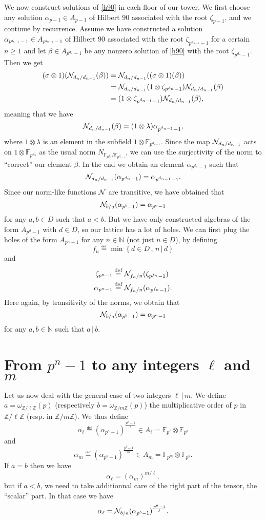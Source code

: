 \documentclass[a4paper,11pt]{article}
\begin{document}
We now construct solutions of \eqref{h90} in each floor of our
tower. We first choose any solution $\alpha_{p-1}\in A_{p-1}$ of Hilbert $90$
associated with the root $\zeta_{p-1}$, and we continue by recurrence. Assume we
have constructed a solution $\alpha_{p^{d_{n-1}}-1}\in A_{p^{d_{n-1}}-1}$ of
Hilbert $90$ associated with the root $\zeta_{p^{d_{n-1}}-1}$ for a certain
$n\geq1$ and let
$\beta\in A_{p^{d_n}-1}$ be any nonzero solution of \eqref{h90} with the root
$\zeta_{p^{d_n}-1}$.
Then we get
\begin{align*}
  (\sigma\otimes1)(\mathcal N_{d_n/d_{n-1}}(\beta)) &= \mathcal N_{d_n/d_{n-1}}((\sigma\otimes1)(\beta)) \\
  &= \mathcal N_{d_n/d_{n-1}}(1\otimes\zeta_{p^{d_n}-1}) \mathcal N_{d_n/d_{n-1}}(\beta) \\
  &= (1\otimes\zeta_{p^{d_{n-1}}-1})\mathcal N_{d_n/d_{n-1}}(\beta),
\end{align*}
meaning that we have
\[
  \mathcal N_{d_n/d_{n-1}}(\beta)=(1\otimes\lambda)\alpha_{p^{d_{n-1}}-1},
\]
where $1\otimes\lambda$ is an element in the subfield $1\otimes\mathbb{F}_{p^{d_{n-1}}}$. Since the map
$\mathcal N_{d_n/d_{n-1}}$ acts on $1\otimes\mathbb{F}_{p^{d_n}}$ as the
usual norm $N_{\mathbb{F}_{p^{d_n}}/\mathbb{F}_{p^{d_{n-1}}}}$, we can use
the surjectivity of the norm to ``correct'' our element $\beta$. In the end we
obtain an element $\alpha_{p^{d_n}-1}$ such
that
\[
  \mathcal N_{d_n/d_{n-1}}(\alpha_{p^{d_n}-1})=
  \alpha_{p^{d_{n-1}}-1}.
\]
Since our norm-like functions $\mathcal N$ are transitive, we have obtained that 
\[
  \mathcal N_{b/a}(\alpha_{p^b-1})=\alpha_{p^a-1}
\]
for any $a,b\in D$ such that $a<b$. But we have only constructed algebras of the form
$A_{p^d-1}$ with $d\in D$, so our lattice has a lot of holes. We can first plug
the holes of the form $A_{p^{n}-1}$ for any $n\in\mathbb{N}$ (not just $n\in
D$), by defining 
\[
  f_n \eqdef \min\left\{ d\in D\,,\,n\,|\,d \right\}
\]
and
\begin{align*}
  \zeta_{p^n-1}&\overset{\text{def}}{=}  \mathcal N_{f_n/n}(\zeta_{p^{f_n}-1})\\
  \alpha_{p^n-1}&\overset{\text{def}}{=}
  \mathcal N_{f_n/n}(\alpha_{p^{f_n}-1}).
\end{align*}
Here again, by transitivity of the norms, we obtain that
\[
  \mathcal N_{b/a}(\alpha_{p^b-1})=\alpha_{p^a-1}
\]
for any $a,b\in\mathbb{N}$ such that $a\,|\,b$.


\section{From $p^n-1$ to any integers $\ell$ and $m$}
Let us now deal with the general case of two integers $\ell\,|\,m$. We define
$a=\omega_{\mathbb{Z}/\ell\mathbb{Z}}(p)$ (respectively
$b=\omega_{\mathbb{Z}/m\mathbb{Z}}(p)$) the multiplicative order of $p$ in
$\mathbb{Z}/\ell\mathbb{Z}$ (resp. in $\mathbb{Z}/m\mathbb{Z}$). We thus define
\[
  \alpha_\ell\eqdef(\alpha_{p^a-1})^{\frac{p^a-1}{\ell}}\in A_{\ell}=\mathbb{F}_{p^\ell}\otimes \mathbb{F}_{p^a}
\]
and
\[
  \alpha_m\eqdef(\alpha_{p^b-1})^{\frac{p^{b}-1}{m}}\in A_m=\mathbb{F}_{p^m}\otimes \mathbb{F}_{p^b}.
\]
If $a=b$ then we have 
\[
  \alpha_{\ell}=(\alpha_m)^{m/\ell},
\]
but if $a<b$, we need to take additionnal care of the right part of the tensor,
the ``scalar'' part. In that case we have
\[
  \alpha_\ell=\mathcal N_{b/a}(\alpha_{p^b-1})^{\frac{p^a-1}{\ell}}.
\]
\end{document}

